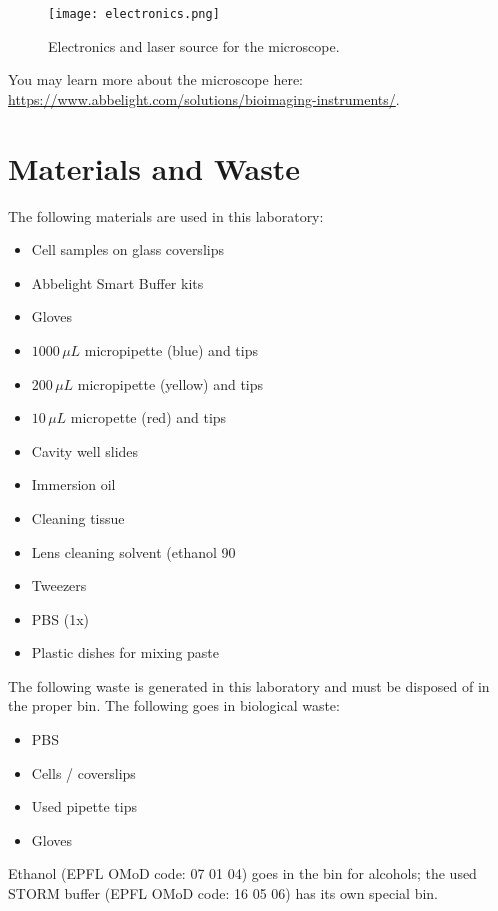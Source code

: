 \documentclass[10pt,a4paper,oneside]{book}
\begin{document}
\begin{figure}[ht]
    \centering
    \texttt{[image: electronics.png]}
    \caption{Electronics and laser source for the microscope.}
    \label{fig:electronics}
\end{figure}

You may learn more about the microscope here: \url{https://www.abbelight.com/solutions/bioimaging-instruments/}.

\section{Materials and Waste}

The following materials are used in this laboratory:

\begin{itemize}
  \item Cell samples on glass coverslips
  \item Abbelight Smart Buffer kits
  \item Gloves
  \item $1000 \, \mu L$ micropipette (blue) and tips
  \item $200 \, \mu L$ micropipette (yellow) and tips
  \item $10 \, \mu L$ micropette (red) and tips
  \item Cavity well slides
  \item Immersion oil
  \item Cleaning tissue
  \item Lens cleaning solvent (ethanol 90%
  \item Tweezers
  \item  PBS (1x)
  \item Plastic dishes for mixing paste
\end{itemize}

The following waste is generated in this laboratory and must be disposed of in the proper bin. The following goes in biological waste:

\begin{itemize}
  \item PBS
  \item Cells / coverslips
  \item Used pipette tips
  \item  Gloves
\end{itemize}

Ethanol (EPFL OMoD code: 07 01 04) goes in the bin for alcohols; the used STORM buffer (EPFL OMoD code: 16 05 06) has its own special bin.
\end{document}
